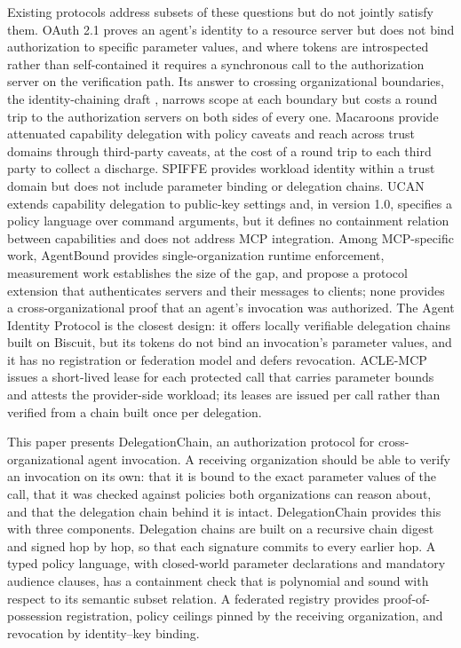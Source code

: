 \documentclass[11pt,a4paper]{article}
\begin{document}
Existing protocols address subsets of these questions but do not jointly
satisfy them. OAuth 2.1 \citep{oauth21} proves an agent's identity to a
resource server but does not bind authorization to specific parameter
values, and where tokens are introspected rather than self-contained it
requires a synchronous call to the authorization server on the
verification path. Its answer to crossing organizational boundaries, the
identity-chaining draft \citep{oauth-identity-chaining}, narrows scope
at each boundary but costs a round trip to the authorization servers on
both sides of every one. Macaroons \citep{birgisson2014macaroons}
provide attenuated capability delegation with policy caveats and reach
across trust domains through third-party caveats, at the cost of a
round trip to each third party to collect a discharge. SPIFFE \citep{spiffe} provides
workload identity within a trust domain but does not include parameter binding
or delegation chains. UCAN \citep{ucan-spec} extends capability delegation to
public-key settings and, in version 1.0, specifies a policy language over
command arguments, but it defines no containment relation between
capabilities and does not address MCP integration.
Among MCP-specific work, AgentBound \citep{buhler2026agentbound}
provides single-organization runtime enforcement, measurement work
\citep{zhou2026mcpauth} establishes the size of the gap, and
\citet{maloyan2026breaking} propose a protocol extension that
authenticates servers and their messages to clients; none provides a
cross-organizational proof that an agent's invocation was authorized.
The Agent Identity Protocol \citep{prakash2026aip} is the closest design:
it offers locally verifiable delegation chains built on Biscuit, but its
tokens do not bind an invocation's parameter values, and it has no
registration or federation model and defers revocation. ACLE-MCP
\citep{ding2026aclemcp} issues a short-lived lease for each protected
call that carries parameter bounds and attests the provider-side
workload; its leases are issued per call rather than verified from a
chain built once per delegation.

This paper presents DelegationChain, an authorization protocol for
cross-organizational agent invocation. A receiving organization should be
able to verify an invocation on its own: that it is bound to the exact
parameter values of the call, that it was checked against policies both
organizations can reason about, and that the delegation chain behind it is
intact. DelegationChain provides this with three components. Delegation
chains are built on a recursive chain digest and signed hop by hop, so
that each signature commits to every earlier hop. A typed policy language,
with closed-world parameter declarations and mandatory audience clauses,
has a containment check that is polynomial and sound with respect to its
semantic subset relation. A federated registry provides proof-of-possession
registration, policy ceilings pinned by the receiving organization, and
revocation by identity--key binding.
\end{document}
